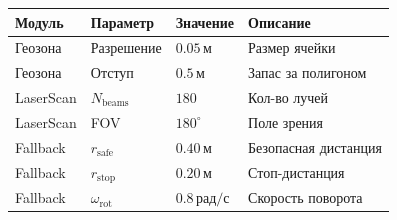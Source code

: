 \begin{center}
\begin{tabular}{llll}
\toprule
\textbf{Модуль} & \textbf{Параметр} & \textbf{Значение} & \textbf{Описание}\\
\midrule
Геозона & Разрешение & $0.05\,\text{м}$ & Размер ячейки\\
Геозона & Отступ & $0.5\,\text{м}$ & Запас за полигоном\\
LaserScan & $N_{\text{beams}}$ & $180$ & Кол-во лучей\\
LaserScan & FOV & $180^\circ$ & Поле зрения\\
Fallback & $r_{\text{safe}}$ & $0.40\,\text{м}$ & Безопасная дистанция\\
Fallback & $r_{\text{stop}}$ & $0.20\,\text{м}$ & Стоп-дистанция\\
Fallback & $\omega_{\text{rot}}$ & $0.8\,\text{рад/с}$ & Скорость поворота\\
\bottomrule
\end{tabular}
\end{center}
